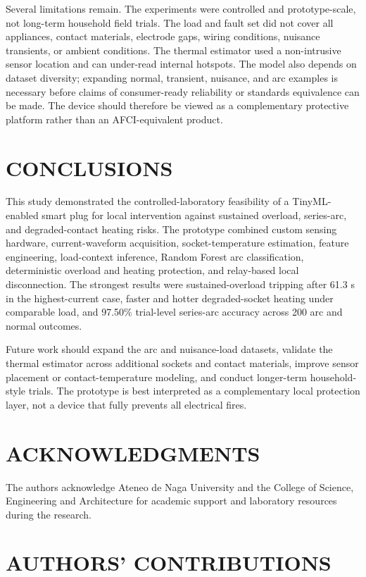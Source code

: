 \documentclass[twocolumn,twoside]{base/ajstd}
\begin{document}
Several limitations remain. The experiments were controlled and prototype-scale, not long-term household field trials. The load and fault set did not cover all appliances, contact materials, electrode gaps, wiring conditions, nuisance transients, or ambient conditions. The thermal estimator used a non-intrusive sensor location and can under-read internal hotspots. The model also depends on dataset diversity; expanding normal, transient, nuisance, and arc examples is necessary before claims of consumer-ready reliability or standards equivalence can be made. The device should therefore be viewed as a complementary protective platform rather than an AFCI-equivalent product.

\section{CONCLUSIONS}

This study demonstrated the controlled-laboratory feasibility of a TinyML-enabled smart plug for local intervention against sustained overload, series-arc, and degraded-contact heating risks. The prototype combined custom sensing hardware, current-waveform acquisition, socket-temperature estimation, feature engineering, load-context inference, Random Forest arc classification, deterministic overload and heating protection, and relay-based local disconnection. The strongest results were sustained-overload tripping after 61.3 s in the highest-current case, faster and hotter degraded-socket heating under comparable load, and 97.50\% trial-level series-arc accuracy across 200 arc and normal outcomes.

Future work should expand the arc and nuisance-load datasets, validate the thermal estimator across additional sockets and contact materials, improve sensor placement or contact-temperature modeling, and conduct longer-term household-style trials. The prototype is best interpreted as a complementary local protection layer, not a device that fully prevents all electrical fires.

\section*{ACKNOWLEDGMENTS}

The authors acknowledge Ateneo de Naga University and the College of Science, Engineering and Architecture for academic support and laboratory resources during the research.

\section*{AUTHORS' CONTRIBUTIONS}
\end{document}
